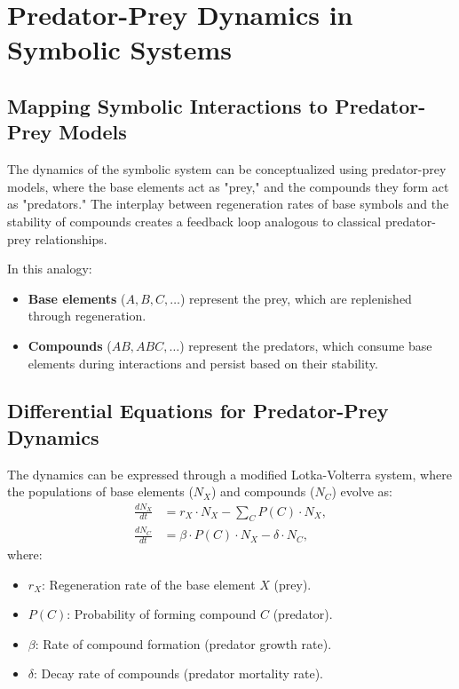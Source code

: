 \documentclass[entropy,article,submit,pdftex,moreauthors]{Definitions/mdpi}
\begin{document}
\section{Predator-Prey Dynamics in Symbolic Systems}

\subsection{Mapping Symbolic Interactions to Predator-Prey Models}

The dynamics of the symbolic system can be conceptualized using predator-prey models, where the base elements act as "prey," and the compounds they form act as "predators." The interplay between regeneration rates of base symbols and the stability of compounds creates a feedback loop analogous to classical predator-prey relationships.

In this analogy:
\begin{itemize}
    \item \textbf{Base elements} (\( A, B, C, \ldots \)) represent the prey, which are replenished through regeneration.
    \item \textbf{Compounds} (\( AB, ABC, \ldots \)) represent the predators, which consume base elements during interactions and persist based on their stability.
\end{itemize}

\subsection{Differential Equations for Predator-Prey Dynamics}

The dynamics can be expressed through a modified Lotka-Volterra system, where the populations of base elements (\( N_X \)) and compounds (\( N_C \)) evolve as:
\begin{align}
\frac{dN_X}{dt} &= r_X \cdot N_X - \sum_C P(C) \cdot N_X, \\
\frac{dN_C}{dt} &= \beta \cdot P(C) \cdot N_X - \delta \cdot N_C,
\end{align}
where:
\begin{itemize}
    \item \( r_X \): Regeneration rate of the base element \( X \) (prey).
    \item \( P(C) \): Probability of forming compound \( C \) (predator).
    \item \( \beta \): Rate of compound formation (predator growth rate).
    \item \( \delta \): Decay rate of compounds (predator mortality rate).
\end{itemize}
\end{document}

